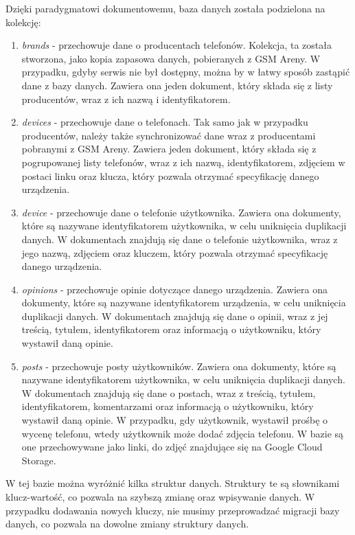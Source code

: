 Dzięki paradygmatowi dokumentowemu, baza danych została podzielona na kolekcję:
\begin{enumerate}
    \item \textit{brands} - przechowuje dane o producentach telefonów. Kolekcja, ta została stworzona, jako kopia zapasowa danych, pobieranych z GSM Areny. W przypadku, gdyby serwis nie był dostępny, można by w łatwy sposób zastąpić dane z bazy danych. Zawiera ona jeden dokument, który składa się z listy producentów, wraz z ich nazwą i identyfikatorem.
    \item \textit{devices} - przechowuje dane o telefonach. Tak samo jak w przypadku producentów, należy także synchronizować dane wraz z producentami pobranymi z GSM Areny. Zawiera jeden dokument, który składa się z pogrupowanej listy telefonów, wraz z ich nazwą, identyfikatorem, zdjęciem w postaci linku oraz klucza, który pozwala otrzymać specyfikację danego urządzenia.
    \item \textit{device} - przechowuje dane o telefonie użytkownika. Zawiera ona dokumenty, które są nazywane identyfikatorem użytkownika, w celu uniknięcia duplikacji danych. W dokumentach znajdują się dane o telefonie użytkownika, wraz z jego nazwą, zdjęciem oraz kluczem, który pozwala otrzymać specyfikację danego urządzenia.
    \item \textit{opinions} - przechowuje opinie dotyczące danego urządzenia. Zawiera ona dokumenty, które są nazywane identyfikatorem urządzenia, w celu uniknięcia duplikacji danych. W dokumentach znajdują się dane o opinii, wraz z jej treścią, tytułem, identyfikatorem oraz informacją o użytkowniku, który wystawił daną opinie.
    \item \textit{posts} - przechowuje posty użytkowników. Zawiera ona dokumenty, które są nazywane identyfikatorem użytkownika, w celu uniknięcia duplikacji danych. W dokumentach znajdują się dane o postach, wraz z treścią, tytułem, identyfikatorem, komentarzami oraz informacją o użytkowniku, który wystawił daną opinie. W przypadku, gdy użytkownik, wystawił prośbę o wycenę telefonu, wtedy użytkownik może dodać zdjęcia telefonu. W bazie są one przechowywane jako linki, do zdjęć znajdujące się na Google Cloud Storage.
\end{enumerate}

W tej bazie można wyróżnić kilka struktur danych. Struktury te są słownikami klucz-wartość, co pozwala na szybszą zmianę oraz wpisywanie danych. W przypadku dodawania nowych kluczy, nie musimy przeprowadzać migracji bazy danych, co pozwala na dowolne zmiany struktury danych.

